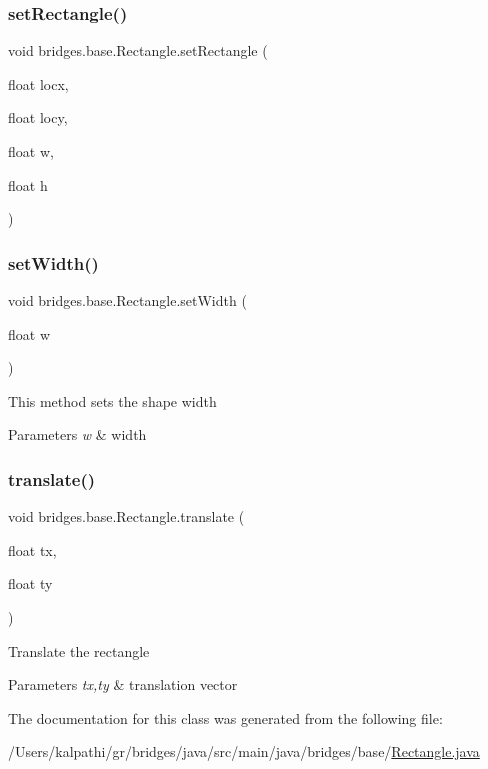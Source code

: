 \subsubsection{\texorpdfstring{setRectangle()}{setRectangle()}}
{\footnotesize\ttfamily void bridges.\+base.\+Rectangle.\+set\+Rectangle (\begin{DoxyParamCaption}\item[{float}]{locx,  }\item[{float}]{locy,  }\item[{float}]{w,  }\item[{float}]{h }\end{DoxyParamCaption})}

\mbox{\label{classbridges_1_1base_1_1_rectangle_a1c42d0e5fc64adc1c2a696c88dd6f82e}} 
\subsubsection{\texorpdfstring{setWidth()}{setWidth()}}
{\footnotesize\ttfamily void bridges.\+base.\+Rectangle.\+set\+Width (\begin{DoxyParamCaption}\item[{float}]{w }\end{DoxyParamCaption})}

This method sets the shape width


\begin{DoxyParams}{Parameters}
{\em w} & width \\
\hline
\end{DoxyParams}
\mbox{\label{classbridges_1_1base_1_1_rectangle_a4fed6a85f136c7946ea4e79f2553cffe}} 
\subsubsection{\texorpdfstring{translate()}{translate()}}
{\footnotesize\ttfamily void bridges.\+base.\+Rectangle.\+translate (\begin{DoxyParamCaption}\item[{float}]{tx,  }\item[{float}]{ty }\end{DoxyParamCaption})}

Translate the rectangle


\begin{DoxyParams}{Parameters}
{\em tx,ty} & translation vector \\
\hline
\end{DoxyParams}


The documentation for this class was generated from the following file\+:\begin{DoxyCompactItemize}
\item 
/\+Users/kalpathi/gr/bridges/java/src/main/java/bridges/base/\mbox{\hyperlink{_rectangle_8java}{Rectangle.\+java}}\end{DoxyCompactItemize}
